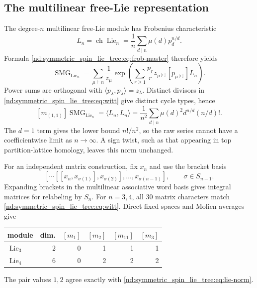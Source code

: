 \documentclass[10pt]{article}
\newcommand{\SMG}{\operatorname{SMG}}
\newcommand{\MGF}{\SMG}
\newcommand{\Lie}{\operatorname{Lie}}
\newcommand{\ch}{\operatorname{ch}}
\begin{document}
\subsection{The multilinear free-Lie representation}

The degree-$n$ multilinear free-Lie module has Frobenius characteristic
\begin{equation}\label{nd:symmetric_spin_lie_tree:eq:witt}
 \boxed{L_n=\ch\Lie_n=\frac1n\sum_{d\mid n}\mu(d)p_d^{n/d}.}
\end{equation}
Formula \eqref{nd:symmetric_spin_lie_tree:eq:frob-master} therefore yields
\begin{equation}\label{nd:symmetric_spin_lie_tree:eq:lie-smg}
 \boxed{
 \MGF_{\Lie_n}=
 \sum_{\mu\vdash n}\frac1{z_\mu}
 \exp\!\left(
 \sum_{r\ge1}\frac{p_r}{r}
 z_{\mu^{[r]}}[p_{\mu^{[r]}}]L_n
 \right).}
\end{equation}
Power sums are orthogonal with
$\langle p_\lambda,p_\lambda\rangle=z_\lambda$.  Distinct divisors in
\eqref{nd:symmetric_spin_lie_tree:eq:witt} give distinct cycle types, hence
\begin{equation}\label{nd:symmetric_spin_lie_tree:eq:lie-norm}
 \boxed{[m_{(1,1)}]\MGF_{\Lie_n}
 =\langle L_n,L_n\rangle
 =\frac1{n^2}\sum_{d\mid n}\mu(d)^2d^{n/d}(n/d)!.}
\end{equation}
The $d=1$ term gives the lower bound $n!/n^2$, so the raw series cannot have
a coefficientwise limit as $n\to\infty$.  A sign twist, such as that appearing
in top partition-lattice homology, leaves this norm unchanged.

For an independent matrix construction, fix $x_n$ and use the bracket basis
\[
 [\cdots[[x_n,x_{\sigma(1)}],x_{\sigma(2)}],\ldots,
 x_{\sigma(n-1)}],\qquad \sigma\in S_{n-1}.
\]
Expanding brackets in the multilinear associative word basis gives integral
matrices for relabeling by $S_n$.  For $n=3,4$, all $30$ matrix characters
match \eqref{nd:symmetric_spin_lie_tree:eq:witt}.  Direct fixed spaces and Molien averages give
\begin{center}
\begin{tabular}{@{}lrrrrr@{}}\toprule
module&dim.&$[m_1]$&$[m_2]$&$[m_{11}]$&$[m_3]$\\\midrule
$\Lie_3$&2&0&1&1&1\\
$\Lie_4$&6&0&2&2&2\\\bottomrule
\end{tabular}
\end{center}
The pair values $1,2$ agree exactly with \eqref{nd:symmetric_spin_lie_tree:eq:lie-norm}.
\end{document}
